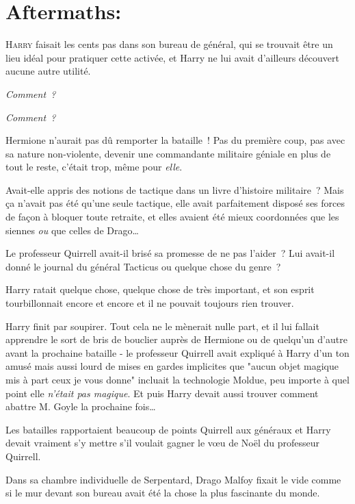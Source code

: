
\section{Aftermaths:}

\lettrine{H}{arry} faisait les cents pas dans son bureau de général, qui se trouvait être un lieu idéal pour pratiquer cette activée, et Harry ne lui avait d'ailleurs découvert aucune autre utilité.

\emph{Comment~?}

\emph{Comment~?}

Hermione n'aurait pas dû remporter la bataille~! Pas du première coup, pas avec sa nature non-violente, devenir une commandante militaire géniale en plus de tout le reste, c'était trop, même pour \emph{elle}.

Avait-elle appris des notions de tactique dans un livre d'histoire militaire~? Mais ça n'avait pas été qu'une seule tactique, elle avait parfaitement disposé ses forces de façon à bloquer toute retraite, et elles avaient été mieux coordonnées que les siennes \emph{ou} que celles de Drago…

Le professeur Quirrell avait-il brisé sa promesse de ne pas l'aider~? Lui avait-il donné le journal du général Tacticus ou quelque chose du genre~?

Harry ratait quelque chose, quelque chose de très important, et son esprit tourbillonnait encore et encore et il ne pouvait toujours rien trouver.

Harry finit par soupirer. Tout cela ne le mènerait nulle part, et il lui fallait apprendre le sort de bris de bouclier auprès de Hermione ou de quelqu'un d'autre avant la prochaine bataille - le professeur Quirrell avait expliqué à Harry d'un ton amusé mais aussi lourd de mises en gardes implicites que "aucun objet magique mis à part ceux je vous donne" incluait la technologie Moldue, peu importe à quel point elle \emph{n'était pas magique}. Et puis Harry devait aussi trouver comment abattre M. Goyle la prochaine fois…

Les batailles rapportaient beaucoup de points Quirrell aux généraux et Harry devait vraiment s'y mettre s'il voulait gagner le vœu de Noël du professeur Quirrell.

\later

Dans sa chambre individuelle de Serpentard, Drago Malfoy fixait le vide comme si le mur devant son bureau avait été la chose la plus fascinante du monde.


